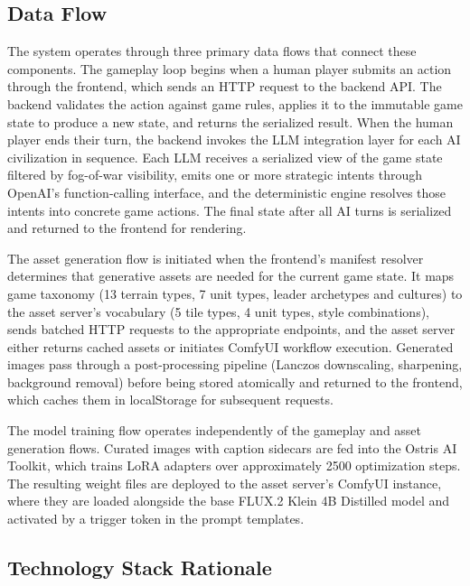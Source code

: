 \documentclass[conference]{IEEEtran}
\begin{document}
\subsection{Data Flow}

The system operates through three primary data flows that connect these components. The gameplay loop begins when a human player submits an action through the frontend, which sends an HTTP request to the backend API. The backend validates the action against game rules, applies it to the immutable game state to produce a new state, and returns the serialized result. When the human player ends their turn, the backend invokes the LLM integration layer for each AI civilization in sequence. Each LLM receives a serialized view of the game state filtered by fog-of-war visibility, emits one or more strategic intents through OpenAI's function-calling interface, and the deterministic engine resolves those intents into concrete game actions. The final state after all AI turns is serialized and returned to the frontend for rendering.

The asset generation flow is initiated when the frontend's manifest resolver determines that generative assets are needed for the current game state. It maps game taxonomy (13 terrain types, 7 unit types, leader archetypes and cultures) to the asset server's vocabulary (5 tile types, 4 unit types, style combinations), sends batched HTTP requests to the appropriate endpoints, and the asset server either returns cached assets or initiates ComfyUI workflow execution. Generated images pass through a post-processing pipeline (Lanczos downscaling, sharpening, background removal) before being stored atomically and returned to the frontend, which caches them in localStorage for subsequent requests.

The model training flow operates independently of the gameplay and asset generation flows. Curated images with caption sidecars are fed into the Ostris AI Toolkit, which trains LoRA adapters over approximately 2500 optimization steps. The resulting weight files are deployed to the asset server's ComfyUI instance, where they are loaded alongside the base FLUX.2 Klein 4B Distilled model and activated by a trigger token in the prompt templates.

\subsection{Technology Stack Rationale}
\end{document}
